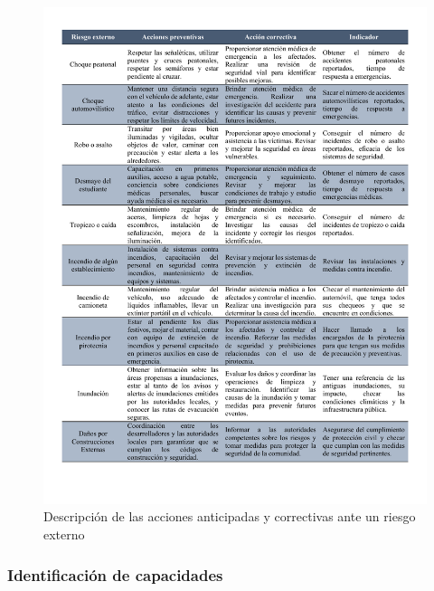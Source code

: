     \begin{figure}[H]
        \centering
        \includegraphics[trim = {10mm 20mm 10mm 10mm},clip,scale=0.41]{22/Img/riesgosExternos2.pdf}
        \caption{Descripción de las acciones anticipadas y correctivas ante un riesgo externo}
        \label{fig:accionAnti}
    \end{figure}
    
    
    
    
    \subsubsection{Identificación de capacidades}
    
